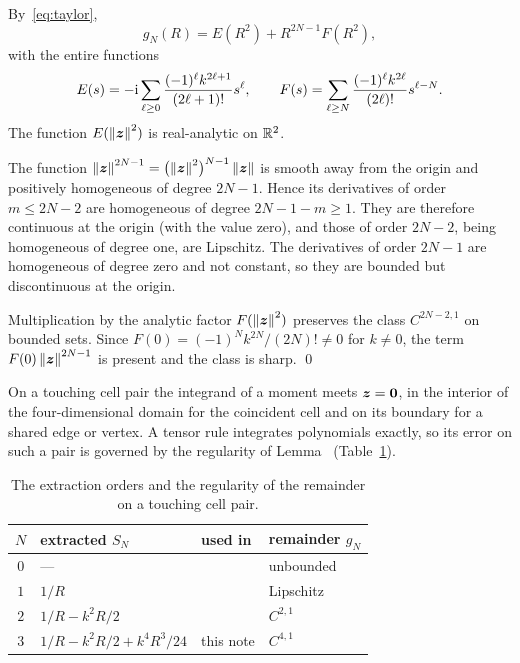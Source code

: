 \vspace{\baselineskip}
\proof By~\eqref{eq:taylor},
\begin{equation}
    g_N(R) = E(R^2) + R^{2N-1}F(R^2),
\end{equation}
with the entire functions
\begin{equation}
    E(s) = -\mathrm{i}\sum_{\ell\ge0}\frac{(-1)^\ell k^{2\ell+1}}{(2\ell+1)!}s^\ell, \qquad
    F(s) = \sum_{\ell\ge N}\frac{(-1)^\ell k^{2\ell}}{(2\ell)!}s^{\ell-N}.
\end{equation}
The function $E(\left\| \vb*{z} \right\|^2)$ is real-analytic on $\mathbb{R}^2$.

The function $\left\| \vb*{z} \right\|^{2N-1}=\bigl(\left\| \vb*{z} \right\|^2\bigr)^{N-1}\left\| \vb*{z} \right\|$ is smooth away from the origin and
positively homogeneous of degree $2N-1$. Hence its derivatives of order $m\le 2N-2$ are homogeneous of degree
$2N-1-m\ge1$. They are therefore continuous at the origin (with the value zero), and those of order $2N-2$, being
homogeneous of degree one, are Lipschitz. The derivatives of order $2N-1$ are homogeneous of degree zero and not constant,
so they are bounded but discontinuous at the origin.

Multiplication by the analytic factor $F(\left\| \vb*{z} \right\|^2)$ preserves the class $C^{2N-2,1}$ on bounded sets. Since
$F(0)=(-1)^Nk^{2N}/(2N)!\ne0$ for $k\ne0$, the term $F(0)\left\| \vb*{z} \right\|^{2N-1}$ is present and the class is sharp. \qed

\vspace{\baselineskip}
On a touching cell pair the integrand of a moment meets $\vb*{z}=\vb*{0}$, in the interior of the four-dimensional domain for
the coincident cell and on its boundary for a shared edge or vertex. A tensor \GL{} rule integrates polynomials exactly,
so its error on such a pair is governed by the regularity of Lemma~ (Table~\ref{tab:extraction}).

\begin{table}[ht]
    \centering
    \caption{The extraction orders and the regularity of the remainder on a touching cell pair.}
    \label{tab:extraction}
    \renewcommand{\arraystretch}{1.25}
    \begin{tabular}{clll}
        \toprule
        $N$ & extracted $S_N$ & used in & remainder $g_N$ \\ \midrule
        $0$ & --- & & unbounded \\
        $1$ & $1/R$ & \cite{Tzoulis2004} & Lipschitz \\
        $2$ & $1/R-k^2R/2$ & \cite{machacek2025method} & $C^{2,1}$ \\
        $3$ & $1/R-k^2R/2+k^4R^3/24$ & this note & $C^{4,1}$ \\ \bottomrule
    \end{tabular}
\end{table}

